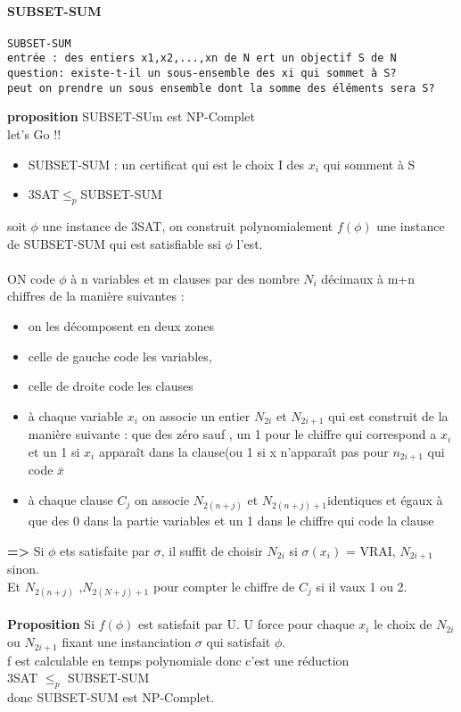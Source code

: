 \documentclass{article}
\begin{document}
\paragraph{SUBSET-SUM}
\begin{verbatim}
SUBSET-SUM
entrée : des entiers x1,x2,...,xn de N ert un objectif S de N
question: existe-t-il un sous-ensemble des xi qui sommet à S?
peut on prendre un sous ensemble dont la somme des éléments sera S?
\end{verbatim}
\textbf{proposition} SUBSET-SUm est NP-Complet\\let's Go !!
\begin{itemize}
\item SUBSET-SUM : un certificat qui est le choix I des $x_i$ qui somment à S
\item 3SAT$\leq_p$SUBSET-SUM
\end{itemize}
soit $\phi$ une instance de 3SAT, on construit polynomialement $f(\phi)$  une instance de SUBSET-SUM qui est satisfiable ssi $\phi$ l'est.\\\\ON code $\phi$ à n variables et m clauses par des nombre $N_i$ décimaux à m+n chiffres de la manière suivantes : 
\begin{itemize}
\item on les décomposent en deux zones
\item celle de gauche code les variables,
\item celle de droite code les clauses
\item à chaque variable $x_i$ on associe un entier $N_{2i}$  et $N_{2i+1}$ qui est construit de la manière suivante : que des zéro sauf , un 1 pour le chiffre qui correspond a $x_i$ et un 1 si $x_i$ apparaît dans la clause(ou 1 si x n’apparaît pas pour $n_{2i+1}$ qui code $\bar{x}$
\item à chaque clause $C_j$ on associe $N_{2(n+j)}$ et $N_{2(n+j)+1}$identiques et égaux à que des 0 dans la partie variables et un 1 dans le chiffre qui code la clause
\end{itemize}
\textbf{=>} Si $\phi$ ets satisfaite par $\sigma$, il suffit de choisir $N_ {2i}$ si $\sigma(x_i)$ = VRAI, $N_{2i+1}$ sinon.\\Et $N_{2(n+j)}$ ,$N_{2(N+j)+1}$ pour compter le chiffre de $C_j$ si il vaux 1 ou 2.\\\\
\textbf{Proposition} Si $f(\phi)$ est satisfait par U. U force pour chaque $x_i$ le choix de $N_{2i}$ ou $N_{2i+1}$ fixant une instanciation $\sigma$ qui satisfait $\phi$.\\f est calculable en temps polynomiale donc c’est une réduction \\3SAT $\leq_p$ SUBSET-SUM\\donc SUBSET-SUM est NP-Complet.\\
\end{document}
